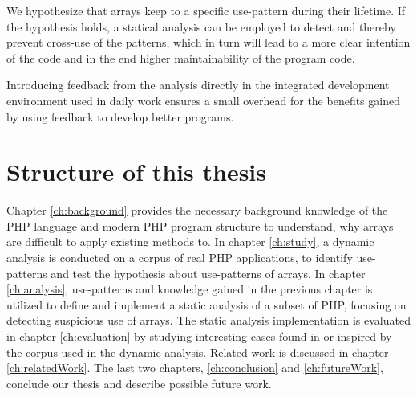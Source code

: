 We hypothesize that arrays keep to a specific use-pattern during their lifetime. If the hypothesis holds, a statical analysis can be employed to detect and thereby prevent cross-use of the patterns, which in turn will lead to a more clear intention of the code and in the end higher maintainability of the program code.

Introducing feedback from the analysis directly in the integrated development environment used in daily work ensures a small overhead for the benefits gained by using feedback to develop better programs.

\section{Structure of this thesis}
Chapter \ref{ch:background} provides the necessary background knowledge of the PHP language and modern PHP program structure to understand, why arrays are difficult to apply existing methods to. In chapter \ref{ch:study}, a dynamic analysis is conducted on a corpus of real PHP applications, to identify use-patterns and test the hypothesis about use-patterns of arrays. In chapter \ref{ch:analysis}, use-patterns and knowledge gained in the previous chapter is utilized to define and implement a static analysis of a subset of PHP, focusing on detecting suspicious use of arrays. The static analysis implementation is evaluated in chapter \ref{ch:evaluation} by studying interesting cases found in or inspired by the corpus used in the dynamic analysis. Related work is discussed in chapter \ref{ch:relatedWork}. The last two chapters, \ref{ch:conclusion} and \ref{ch:futureWork}, conclude our thesis and describe possible future work.
